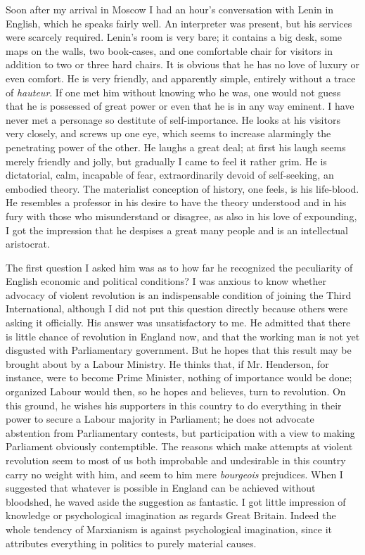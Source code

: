Soon after my arrival in Moscow I had an hour's conversation with Lenin in English, which he speaks fairly well. An interpreter was present, but his services were scarcely required. Lenin's room is very bare; it contains a big desk, some maps on the walls, two book-cases, and one comfortable chair for visitors in addition to two or three hard chairs. It is obvious that he has no love of luxury or even comfort. He is very friendly, and apparently simple, entirely without a trace of \emph{hauteur}. If one met him without knowing who he was, one would not guess that he is possessed of great power or even that he is in any way eminent. I have never met a personage so destitute of self-importance. He looks at his visitors very closely, and screws up one eye, which seems to increase alarmingly the penetrating power of the other. He laughs a great deal; at first his laugh seems merely friendly and jolly, but gradually I came to feel it rather grim. He is dictatorial, calm, incapable of fear, extraordinarily devoid of self-seeking, an embodied theory. The materialist conception of history, one feels, is his life-blood. He resembles a professor in his desire to have the theory understood and in his fury with those who misunderstand or disagree, as also in his love of expounding, I got the impression that he despises a great many people and is an intellectual aristocrat.

The first question I asked him was as to how far he recognized the peculiarity of English economic and political conditions? I was anxious to know whether advocacy of violent revolution is an indispensable condition of joining the Third International, although I did not put this question directly because others were asking it officially. His answer was unsatisfactory to me. He admitted that there is little chance of revolution in England now, and that the working man is not yet disgusted with Parliamentary government. But he hopes that this result may be brought about by a Labour Ministry. He thinks that, if Mr. Henderson, for instance, were to become Prime Minister, nothing of importance would be done; organized Labour would then, so he hopes and believes, turn to revolution. On this ground, he wishes his supporters in this country to do everything in their power to secure a Labour majority in Parliament; he does not advocate abstention from Parliamentary contests, but participation with a view to making Parliament obviously contemptible. The reasons which make attempts at violent revolution seem to most of us both improbable and undesirable in this country carry no weight with him, and seem to him mere \emph{bourgeois} prejudices. When I suggested that whatever is possible in England can be achieved without bloodshed, he waved aside the suggestion as fantastic. I got little impression of knowledge or psychological imagination as regards Great Britain. Indeed the whole tendency of Marxianism is against psychological imagination, since it attributes everything in politics to purely material causes.

